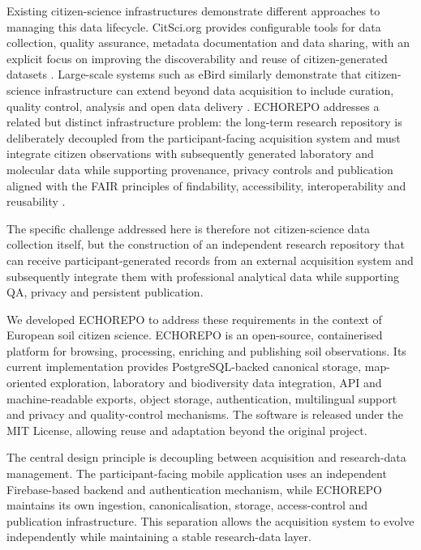 Existing citizen-science infrastructures demonstrate different approaches
to managing this data lifecycle. CitSci.org provides configurable tools
for data collection, quality assurance, metadata documentation and data
sharing, with an explicit focus on improving the discoverability and reuse
of citizen-generated datasets \parencite{wang2015citsci}. Large-scale
systems such as eBird similarly demonstrate that citizen-science
infrastructure can extend beyond data acquisition to include curation,
quality control, analysis and open data delivery
\parencite{sullivan2014ebird}. ECHOREPO addresses a related but distinct
infrastructure problem: the long-term research repository is deliberately
decoupled from the participant-facing acquisition system and must integrate
citizen observations with subsequently generated laboratory and molecular
data while supporting provenance, privacy controls and publication aligned with the FAIR principles
of findability, accessibility, interoperability and reusability
\parencite{wilkinson2016fair}.

The specific challenge addressed here is therefore not citizen-science
data collection itself, but the construction of an independent research
repository that can receive participant-generated records from an
external acquisition system and subsequently integrate them with
professional analytical data while supporting QA, privacy and persistent
publication.

We developed ECHOREPO to address these requirements in the context of European soil citizen science. ECHOREPO is an open-source, containerised platform for browsing, processing, enriching and publishing soil observations. Its current implementation provides PostgreSQL-backed canonical storage, map-oriented exploration, laboratory and biodiversity data integration, API and machine-readable exports, object storage, authentication, multilingual support and privacy and quality-control mechanisms. The software is released under the MIT License, allowing reuse and adaptation beyond the original project.

The central design principle is decoupling between acquisition and research-data management. The participant-facing mobile application uses an independent Firebase-based backend and authentication mechanism, while ECHOREPO maintains its own ingestion, canonicalisation, storage, access-control and publication infrastructure. This separation allows the acquisition system to evolve independently while maintaining a stable research-data layer.

